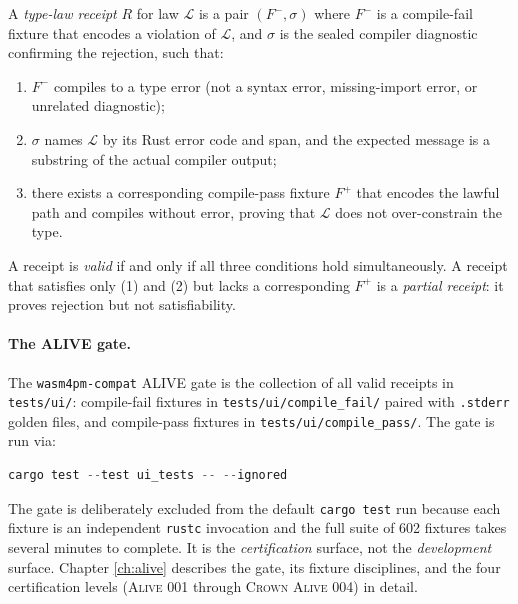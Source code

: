 \begin{definition}
\label{def:type-law-receipt}
A \emph{type-law receipt} $R$ for law $\mathcal{L}$ is a pair
$(F^-, \sigma)$ where $F^-$ is a compile-fail fixture that encodes a
violation of $\mathcal{L}$, and $\sigma$ is the sealed compiler diagnostic
confirming the rejection, such that:
\begin{enumerate}
  \item $F^-$ compiles to a type error (not a syntax error, missing-import
        error, or unrelated diagnostic);
  \item $\sigma$ names $\mathcal{L}$ by its Rust error code and span, and
        the expected message is a substring of the actual compiler output;
  \item there exists a corresponding compile-pass fixture $F^+$ that encodes
        the lawful path and compiles without error, proving that $\mathcal{L}$
        does not over-constrain the type.
\end{enumerate}
A receipt is \emph{valid} if and only if all three conditions hold simultaneously.
A receipt that satisfies only (1) and (2) but lacks a corresponding $F^+$ is
a \emph{partial receipt}: it proves rejection but not satisfiability.
\end{definition}

\paragraph{The ALIVE gate.}
The \texttt{wasm4pm-compat} ALIVE gate is the collection of all valid receipts
in \texttt{tests/ui/}: compile-fail fixtures in \texttt{tests/ui/compile\_fail/}
paired with \texttt{.stderr} golden files, and compile-pass fixtures in
\texttt{tests/ui/compile\_pass/}. The gate is run via:

\begin{lstlisting}[language=Rust, caption={Running the ALIVE gate. The
  \texttt{--ignored} flag is required because trybuild fixtures are marked
  \texttt{\#[ignore]} to exclude them from the fast dev-loop test run.},
  label={lst:bg-alive-gate}]
cargo test --test ui_tests -- --ignored
\end{lstlisting}

The gate is deliberately excluded from the default \texttt{cargo test} run
because each fixture is an independent \texttt{rustc} invocation and the
full suite of 602 fixtures takes several minutes to complete. It is the
\emph{certification} surface, not the \emph{development} surface. Chapter
\ref{ch:alive} describes the gate, its fixture disciplines, and the four
certification levels (\textsc{Alive 001} through \textsc{Crown Alive 004})
in detail.
